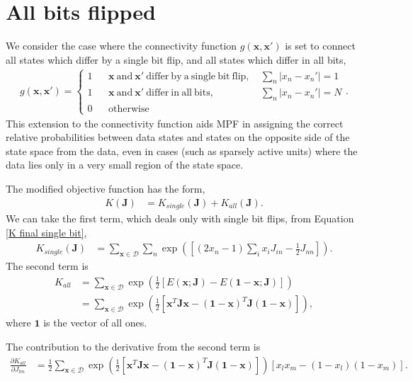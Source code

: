\documentclass{article}
\newcommand{\pd}[2]{\frac{\partial #1}{\partial #2}}
\newcommand{\mb}{\mathbf}
\begin{document}
\section{All bits flipped}\label{sec all bit}

We consider the case where the connectivity function $g\left( \mb x, \mb x' \right)$ is set to connect all states which differ by a single bit flip, and all states which differ in all bits,
\begin{align}
g\left( \mb x, \mb x' \right)
 =
	\left\{\begin{array}{ccrl}
1 & & \mb x \mathrm{\ and\ } \mb x' \mathrm{\ differ\ by\ a\ single\ bit\ flip,\ } & \sum_n \left| x_n - x_n' \right| = 1 \\ %
1 & & \mb x \mathrm{\ and\ } \mb x' \mathrm{\ differ\ in\ all\ bits,\ } & \sum_n \left| x_n - x_n' \right| = N \\ %
0 & & \mathrm{otherwise} & 
	\end{array}\right.
\label{trans}
.
\end{align}
This extension to the connectivity function aids MPF in assigning the correct relative probabilities between data states and states on the opposite side of the state space from the data, even in cases (such as sparsely active units) where the data lies only in a very small region of the state space.

The modified objective function has the form, 
\begin{align}
K\left( \mb J \right) & = K_{single}\left( \mb J \right) + K_{all}\left( \mb J \right)
.
\end{align}
We can take the first term, which deals only with single bit flips, from Equation \ref{K final single bit},
\begin{align}
K_{single}\left( \mb J \right) & = \sum_{\mb x \in \mathcal D} \sum_n \exp\left( \left[
\left( 2 x_n - 1 \right) \sum_i x_i J_{in}
-
\frac{1}{2}J_{nn}
\right]
\right)
.
\end{align}
The second term is
\begin{align}
K_{all} & = \sum_{\mb x \in \mathcal D} \exp\left( \frac{1}{2}\left[
E(\mb x; \mb J) - E(\mb 1 - \mb x; \mb J) \right] \right) \\
& = \sum_{\mb x \in \mathcal D} \exp\left( \frac{1}{2}\left[
\mb x^T \mb J \mb x - 
\left( \mb 1 - \mb x\right)^T \mb J \left( \mb 1 - \mb x\right) \right] \right)
,
\end{align}
where $\mb 1$ is the vector of all ones.

The contribution to the derivative from the second term is
\begin{align}
\pd{K_{all}}{J_{lm}} & = \frac{1}{2}\sum_{\mb x \in \mathcal D} \exp\left( \frac{1}{2}\left[
\mb x^T \mb J \mb x - 
\left( \mb 1 - \mb x\right)^T \mb J \left( \mb 1 - \mb x\right) \right] \right)
\left[
x_l x_m - \left( 1 - x_l \right) \left( 1 - x_m \right)
\right]
.
\end{align}
		
\end{document}
